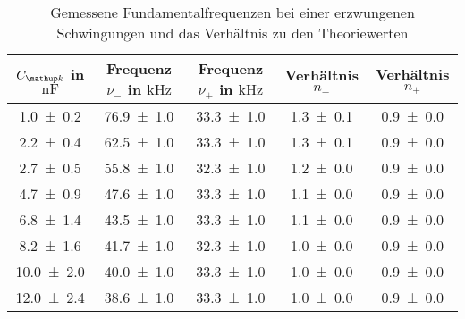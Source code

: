 \begin{table} 
\centering 
\caption{Gemessene Fundamentalfrequenzen bei einer erzwungenen Schwingungen und das Verhältnis zu den Theoriewerten} 
\label{fig:teilb_schwingungen_prak_theo} 
\begin{tabular}{S S S S S } 
\toprule  
{$C\ua{k}$ in $\si{\nano\farad}$} & {Frequenz $\nu_-$ in $\si{\kilo\hertz}$} & {Frequenz $\nu_+$ in $\si{\kilo\hertz}$}& {Verhältnis $n_-$} & {Verhältnis $n_+$}  \\ 
\midrule  
 \num{1.0\pm0.2} & \num{76.9\pm1.0} & \num{33.3\pm1.0} & \num{1.3\pm0.1} & \num{0.9\pm0.0}\\ 
\num{2.2\pm0.4} & \num{62.5\pm1.0} & \num{33.3\pm1.0} & \num{1.3\pm0.1} & \num{0.9\pm0.0}\\ 
\num{2.7\pm0.5} & \num{55.8\pm1.0} & \num{32.3\pm1.0} & \num{1.2\pm0.0} & \num{0.9\pm0.0}\\ 
\num{4.7\pm0.9} & \num{47.6\pm1.0} & \num{33.3\pm1.0} & \num{1.1\pm0.0} & \num{0.9\pm0.0}\\ 
\num{6.8\pm1.4} & \num{43.5\pm1.0} & \num{33.3\pm1.0} & \num{1.1\pm0.0} & \num{0.9\pm0.0}\\ 
\num{8.2\pm1.6} & \num{41.7\pm1.0} & \num{32.3\pm1.0} & \num{1.0\pm0.0} & \num{0.9\pm0.0}\\ 
\num{10.0\pm2.0} & \num{40.0\pm1.0} & \num{33.3\pm1.0} & \num{1.0\pm0.0} & \num{0.9\pm0.0}\\ 
\num{12.0\pm2.4} & \num{38.6\pm1.0} & \num{33.3\pm1.0} & \num{1.0\pm0.0} & \num{0.9\pm0.0}\\ 
\bottomrule 
\end{tabular} 
\end{table}
